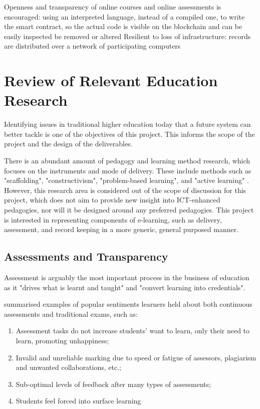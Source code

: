 Openness and transparency of online courses and online assessments is encouraged: using an interpreted language, instead of a compiled 
one, to write the smart contract, so the actual code is visible on the blockchain and can be easily inspected
be removed or altered
Resilient to loss of infrastructure: records are distributed over a network of participating computers

\section{Review of Relevant Education Research}

Identifying issues in traditional higher education today that a future system can better 
tackle is one of the objectives of this project. This informs the scope of the 
project and the design of the deliverables.

There is an abundant amount of pedagogy and learning method research, which focuses on the 
instruments and mode of delivery. These include methods such as "scaffolding", "constructivism", 
"problem-based learning", and "active learning" \citep{ali2005effective}. However, this 
research area is considered out of the scope of discussion for this project, which does not 
aim to provide new insight into ICT-enhanced pedagogies, nor will it be designed around any 
preferred pedagogies. This project is interested in representing components of e-learning, 
such as delivery, assessment, and record keeping in a more generic, general purposed manner.

\subsection{Assessments and Transparency}

Assessment is arguably the most important process in the business of education as it "drives what 
is learnt and taught" and "convert learning into credentials". \citep[p.160]{campbell2010digital}

\citet{brown1999assessment} summarised examples of popular sentiments learners held about both 
continuous assessments and traditional exams, such as:

\begin{enumerate}
    \item Assessment tasks do not increase students' want to learn, only their need to learn, promoting unhappiness;
    \item Invalid and unreliable marking due to speed or fatigue of assessors, plagiarism and unwanted collaborations, etc.;
    \item Sub-optimal levels of feedback after many types of assessments;
    \item Students feel forced into surface learning
    \citep[p.62-65]{brown1999assessment}
\end{enumerate}

